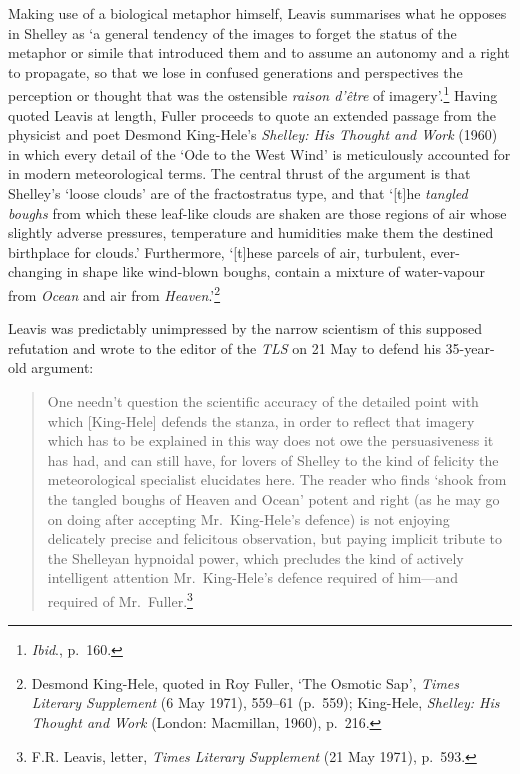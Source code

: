 \documentclass[]{article}
\begin{document}
\noindent Making use of a biological metaphor himself, Leavis summarises
what he opposes in Shelley as `a general tendency of the images to
forget the status of the metaphor or simile that introduced them and to
assume an autonomy and a right to propagate, so that we lose in confused
generations and perspectives the perception or thought that was the
ostensible \emph{raison d'être} of imagery'.\footnote{\emph{Ibid}.,
  p.~160.} Having quoted Leavis at length, Fuller proceeds to quote an
extended passage from the physicist and poet Desmond King-Hele's
\emph{Shelley: His Thought and Work} (1960) in which every detail of the
`Ode to the West Wind' is meticulously accounted for in modern
meteorological terms. The central thrust of the argument is that
Shelley's `loose clouds' are of the fractostratus type, and that
`{[}t{]}he \emph{tangled boughs} from which these leaf-like clouds are
shaken are those regions of air whose slightly adverse pressures,
temperature and humidities make them the destined birthplace for
clouds.' Furthermore, `{[}t{]}hese parcels of air, turbulent,
ever-changing in shape like wind-blown boughs, contain a mixture of
water-vapour from \emph{Ocean} and air from \emph{Heaven}.'\footnote{Desmond
  King-Hele, quoted in Roy Fuller, `The Osmotic Sap', \emph{Times
  Literary Supplement} (6 May 1971), 559--61 (p.~559); King-Hele,
  \emph{Shelley: His Thought and Work} (London: Macmillan, 1960),
  p.~216.}

Leavis was predictably unimpressed by the narrow scientism of this
supposed refutation and wrote to the editor of the \emph{TLS} on 21 May
to defend his 35-year-old argument:

\begin{quote}
One needn't question the scientific accuracy of the detailed point with
which {[}King-Hele{]} defends the stanza, in order to reflect that
imagery which has to be explained in this way does not owe the
persuasiveness it has had, and can still have, for lovers of Shelley to
the kind of felicity the meteorological specialist elucidates here. The
reader who finds `shook from the tangled boughs of Heaven and Ocean'
potent and right (as he may go on doing after accepting Mr.~King-Hele's
defence) is not enjoying delicately precise and felicitous observation,
but paying implicit tribute to the Shelleyan hypnoidal power, which
precludes the kind of actively intelligent attention Mr.~King-Hele's
defence required of him---and required of Mr.~Fuller.\footnote{F.R.
  Leavis, letter, \emph{Times Literary Supplement} (21 May 1971),
  p.~593.}
\end{quote}
\end{document}
